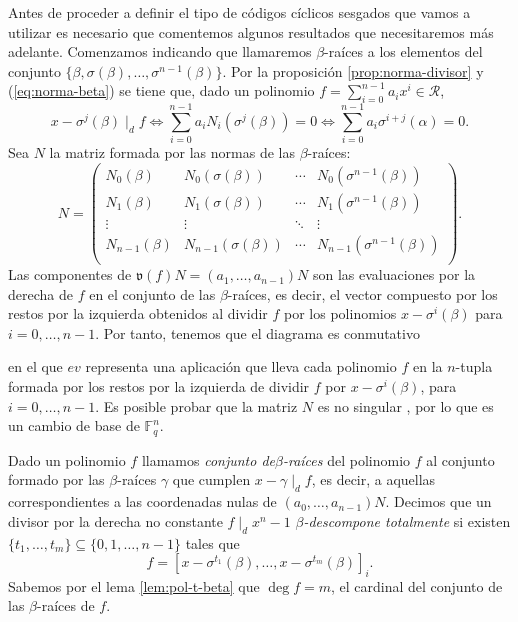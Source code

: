 Antes de proceder a definir el tipo de códigos cíclicos sesgados que vamos a utilizar es necesario que comentemos algunos resultados que necesitaremos más adelante.
Comenzamos indicando que llamaremos \(\beta\)-raíces a los elementos del conjunto \(\{\beta, \sigma(\beta), \dots, \sigma^{n-1}(\beta)\}\).
Por la proposición \ref{prop:norma-divisor} y (\ref{eq:norma-beta}) se tiene que, dado un polinomio \(f = \sum_{i=0}^{n-1}a_ix^i \in \mathcal R\),
\begin{equation}
  \label{eq:equivalencias-divisor-sigma-b}
  x - \sigma^j(\beta) \mid_d f \iff \sum_{i=0}^{n-1}a_iN_i(\sigma^j(\beta)) = 0 \iff \sum_{i=0}^{n-1}a_i\sigma^{i+j}(\alpha) = 0.
\end{equation}
Sea \(N\) la matriz formada por las normas de las \(\beta\)-raíces:
\[
  N = \begin{pmatrix}
    N_0(\beta) & N_0(\sigma(\beta)) & \cdots & N_0(\sigma^{n-1}(\beta))\\
    N_1(\beta) & N_1(\sigma(\beta)) & \cdots & N_1(\sigma^{n-1}(\beta))\\
    \vdots & \vdots & \ddots & \vdots\\
    N_{n-1}(\beta) & N_{n-1}(\sigma(\beta)) & \cdots & N_{n-1}(\sigma^{n-1}(\beta))\\
  \end{pmatrix}.
\]
Las componentes de \(\mathfrak v(f)N = (a_1, \dots, a_{n-1})N\) son las evaluaciones por la derecha de \(f\) en el conjunto de las \(\beta\)-raíces, es decir, el vector compuesto por los restos por la izquierda obtenidos al dividir \(f\) por los polinomios \(x - \sigma^i(\beta)\) para \(i = 0, \dots, n - 1\).
Por tanto, tenemos que el diagrama es conmutativo
\begin{center}
\end{center}
en el que \(ev\) representa una aplicación que lleva cada polinomio \(f\) en la \(n\)-tupla formada por los restos por la izquierda de dividir \(f\) por \(x - \sigma^i(\beta)\), para \(i = 0, \dots, n - 1\).
Es posible probar que la matriz \(N\) es no singular \parencite[ver][Lema 2.1]{gomez-torrecillas_petersongorensteinzierler_2018}, por lo que es un cambio de base de \(\mathbb F_q^n\).

Dado un polinomio \(f\) llamamos \emph{conjunto de}\(\beta\)\emph{-raíces} del polinomio \(f\) al conjunto formado por las \(\beta\)-raíces \(\gamma\) que cumplen \(x - \gamma \mid_d f\), es decir, a aquellas correspondientes a las coordenadas nulas de \((a_0, \dots, a_{n-1})N\).
Decimos que un divisor por la derecha no constante \(f \mid_d x^n - 1\) \(\beta\)\emph{-descompone totalmente} si existen \(\{t_1, \dots, t_m\} \subseteq \{0, 1, \dots, n-1\}\) tales que
\[
  f = \left[x - \sigma^{t_1}(\beta), \dots, x - \sigma^{t_m}(\beta)\right]_{i}.
\]
Sabemos por el lema \ref{lem:pol-t-beta} que \(\deg f = m\), el cardinal del conjunto de las \(\beta\)-raíces de \(f\).

